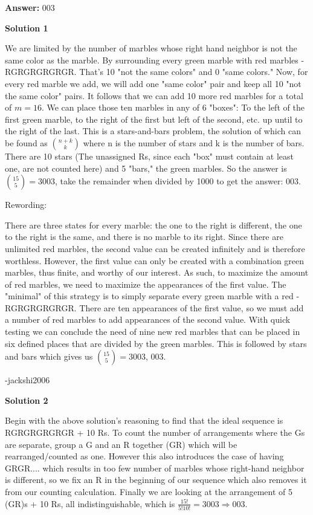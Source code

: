 \begin{enumerate}
 
 \textbf{Answer: }003



\textbf{Solution 1}

We are limited by the number of marbles whose right hand neighbor is not the same color as the marble.  By surrounding every green marble with red marbles - RGRGRGRGRGR.  That's 10 "not the same colors" and 0 "same colors."  Now, for every red marble we add, we will add one "same color" pair and keep all 10 "not the same color" pairs.  It follows that we can add 10 more red marbles for a total of $m = 16$.  We can place those ten marbles  in any of 6 "boxes": To the left of the first green marble, to the right of the first but left of the second, etc. up until to the right of the last.  This is a stars-and-bars problem, the solution of which can be found as $\binom{n+k}{k}$ where n is the number of stars and k is the number of bars.  There are 10 stars (The unassigned Rs, since each "box" must contain at least one, are not counted here) and 5 "bars," the green marbles.  So the answer is $\binom{15}{5} = 3003$, take the remainder when divided by 1000 to get the answer: $\boxed{003}$.

 
Rewording:

 There are three states for every marble: the one to the right is different, the one to the right is the same, and there is no marble to its right. Since there are unlimited red marbles, the second value can be created infinitely and is therefore worthless. However, the first value can only be created with a combination green marbles, thus finite, and worthy of our interest. As such, to maximize the amount of red marbles, we need to maximize the appearances of the first value. The "minimal" of this strategy is to simply separate every green marble with a red - RGRGRGRGRGR. There are ten appearances of the first value, so we must add a number of red marbles to add appearances of the second value. With quick testing we can conclude the need of nine new red marbles that can be placed in six defined places that are divided by the green marbles. This is followed by stars and bars which gives us $\binom{15}{5} = 3003$, $\boxed{003}$.

 
-jackshi2006

 



\textbf{Solution 2}

Begin with the above solution's reasoning to find that the ideal sequence is RGRGRGRGRGR + 10 Rs. To count the number of arrangements where the Gs are separate, group a G and an R together (GR) which will be rearranged/counted as one. However this also introduces the case of having GRGR.... which results in too few number of marbles whose right-hand neighbor is different, so we fix an R in the beginning of our sequence which also removes it from our counting calculation. Finally we are looking at the arrangement of 5 (GR)s + 10 Rs, all indistinguishable, which is $\frac{15!}{5!10!}=3003\Longrightarrow\boxed{003}$.


\end{enumerate}
